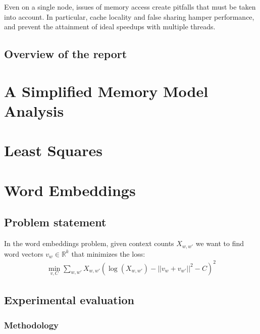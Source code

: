 \documentclass[times,11pt]{article}
\numberwithin{equation}{section}		%
\numberwithin{figure}{section}			%
\numberwithin{table}{section}				%
\newcommand{\ltwonorm}[1]{\left|\left|{#1}\right|\right|}
\begin{document}
Even on a single node, issues of memory access create pitfalls that must be taken into account. In particular, cache locality and false sharing hamper performance,
and prevent the attainment of ideal speedups with multiple threads.




\subsection{Overview of the report}

\section{A Simplified Memory Model Analysis}

\section{Least Squares}

\section{Word Embeddings}


\subsection{Problem statement}
In the word embeddings problem, given context counts $X_{w,w'}$ we want to find word vectors
$v_{w} \in \mathbb{R}^{k}$ that minimizes the loss:
\begin{align*}
\min_{v,C}\sum_{w,w'}X_{w,w'} \left(\log(X_{w,w'}) - \ltwonorm{v_w+v_{w'}}^2 - C\right)^2
\end{align*}

\subsection{Experimental evaluation}
\subsubsection{Methodology}
\end{document}
